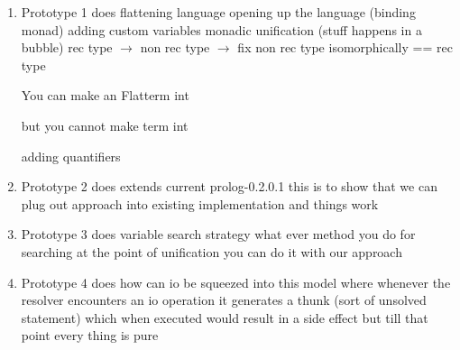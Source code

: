 \documentclass[thesis-solanki.tex]{subfiles}
\begin{document}
\begin{enumerate}
\item Prototype 1 does
flattening language
opening up the language (binding monad)
adding custom variables
monadic unification (stuff happens in a bubble)
rec type $\rightarrow$ non rec type $\rightarrow$ fix non rec type isomorphically == rec type

You can make an Flatterm int

but you cannot make term int

adding quantifiers


\item Prototype 2 does
extends current prolog-0.2.0.1
this is to show that we can plug out approach into existing implementation and things work

\item Prototype 3 does
variable search strategy
what ever method you do for searching at the point of unification you can do it with our approach

\item Prototype 4 does
how can io be squeezed into this model where whenever the resolver encounters an io operation it generates a thunk (sort of unsolved
statement) which when executed would result in a side effect but till that point every thing is pure

\end{enumerate}
\end{document}

